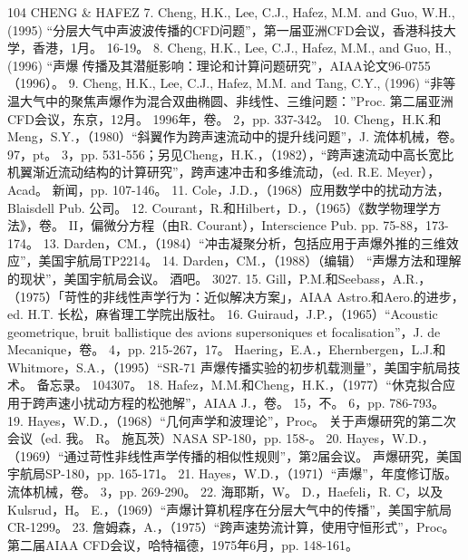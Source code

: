 \documentclass[UTF8,11pt,a4paper,openany,fontset=fandol]{ctexbook}
\begin{document}
104 CHENG \& HAFEZ 7. Cheng, H.K., Lee, C.J., Hafez, M.M. and Guo, W.H., (1995) “分层大气中声波波传播的CFD问题”，第一届亚洲CFD会议，香港科技大学，香港，1月。 16-19。 8. Cheng, H.K., Lee, C.J., Hafez, M.M., and Guo, H., (1996) “声爆 传播及其潜艇影响：理论和计算问题研究”，AIAA论文96-0755（1996）。 9. Cheng, H.K., Lee, C.J., Hafez, M.M. and Tang, C.Y., (1996) “非等温大气中的聚焦声爆作为混合双曲椭圆、非线性、三维问题：”Proc. 第二届亚洲CFD会议，东京，12月。 1996年，卷。 2，pp. 337-342。 10. Cheng，H.K.和Meng，S.Y.，（1980）“斜翼作为跨声速流动中的提升线问题”，J. 流体机械，卷。 97，pt。 3，pp. 531-556；另见Cheng，H.K.，（1982），“跨声速流动中高长宽比机翼渐近流动结构的计算研究”，跨声速冲击和多维流动，（ed. R.E. Meyer），Acad。 新闻，pp. 107-146。 11. Cole，J.D.，（1968）应用数学中的扰动方法，Blaisdell Pub. 公司。 12. Courant，R.和Hilbert，D.，（1965）《数学物理学方法》，卷。 II，偏微分方程（由R. Courant），Interscience Pub. pp. 75-88，173-174。 13. Darden，CM.，（1984）“冲击凝聚分析，包括应用于声爆外推的三维效应”，美国宇航局TP2214。 14. Darden，CM.，（1988）（编辑） “声爆方法和理解的现状”，美国宇航局会议。 酒吧。 3027. 15. Gill，P.M.和Seebass，A.R.，（1975）「苛性的非线性声学行为：近似解决方案」，AIAA Astro.和Aero.的进步，ed. H.T. 长松，麻省理工学院出版社。 16. Guiraud，J.P.，（1965）“Acoustic geometrique, bruit ballistique des avions supersoniques et focalisation”，J. de Mecanique，卷。 4，pp. 215-267，17。 Haering，E.A.，Ehernbergen，L.J.和Whitmore，S.A.，（1995）“SR-71 声爆传播实验的初步机载测量”，美国宇航局技术。 备忘录。 104307。 18. Hafez，M.M.和Cheng，H.K.，（1977）“休克拟合应用于跨声速小扰动方程的松弛解”，AIAA J.，卷。 15，不。 6，pp. 786-793。 19. Hayes，W.D.，（1968）“几何声学和波理论”，Proc。 关于声爆研究的第二次会议（ed. 我。 R。 施瓦茨）NASA SP-180，pp. 158-。 20. Hayes，W.D.，（1969）“通过苛性非线性声学传播的相似性规则”，第2届会议。 声爆研究，美国宇航局SP-180，pp. 165-171。 21. Hayes，W.D.，（1971）“声爆”，年度修订版。 流体机械，卷。 3，pp. 269-290。 22. 海耶斯，W。 D.，Haefeli，R. C，以及Kulsrud，H。 E.，（1969）“声爆计算机程序在分层大气中的传播”，美国宇航局CR-1299。 23. 詹姆森，A.，（1975）“跨声速势流计算，使用守恒形式”，Proc。 第二届AIAA CFD会议，哈特福德，1975年6月，pp. 148-161。
\end{document}
